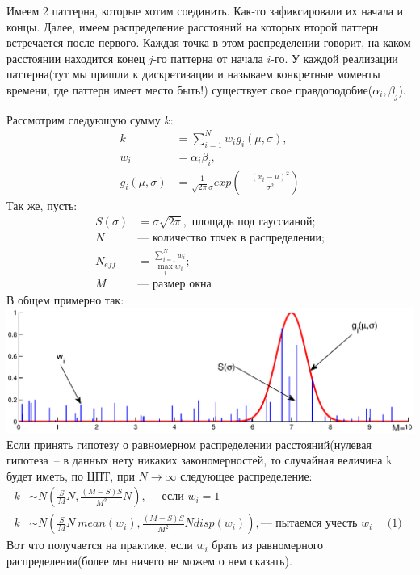 \documentclass[12pt]{letter}
\author{Вишневский~Валерий~Викторович}
\begin{document}
Имеем 2 паттерна, которые хотим соединить. Как-то зафиксировали их начала и концы.
Далее, имеем распределение расстояний на которых второй паттерн встречается после первого.
Каждая точка в этом распределении говорит, на каком расстоянии находится конец $j$-го паттерна
от начала $i$-го. У каждой реализации паттерна(тут мы пришли к дискретизации и называем конкретные
моменты времени, где паттерн имеет место быть!) существует свое правдоподобие($\alpha_i, \beta_j $).

Рассмотрим следующую сумму $k$:
\[
\begin{aligned}
k&=\sum_{i=1}^N w_ig_i(\mu,\sigma),   \\
w_i&=\alpha_i\beta_i, \\
g_i(\mu,\sigma)&=\frac{1}{\sqrt{2\pi}\sigma}exp\left(- \frac{(x_i-\mu)^2}{\sigma^2} \right) 
\end{aligned}
\]
Так же, пусть:
$$
\begin{aligned}
S(\sigma) &= \sigma\sqrt{2\pi}, \text{ площадь под гауссианой};\\
N &\text{--- количество точек в распределении};\\
N_{eff} &= \frac{\sum_{i=1}^N w_i}{\max_i{w_i}};\\
M &\text{--- размер окна}
\end{aligned}
$$
В общем примерно так:\\
\includegraphics[width=200mm]{example.eps}
Если принять гипотезу о равномерном распределении расстояний(нулевая гипотеза~-- в данных нету никаких
закономерностей, то случайная величина k будет иметь, по ЦПТ, при $N\to\infty$ следующее распределение:
$$
\begin{aligned}\label{Norm}
k &\sim N \left( \frac SM N, \frac{(M-S)S}{M^2}N \right), \text{--- если $w_i=1$} \\
k &\sim N \left( \frac SM N~ mean({w_i}), \frac{(M-S)S}{M^2}N disp(w_i)  \right), \text{--- пытаемся учесть $w_i$~~~~(1) } 
\end{aligned}
$$
Вот что получается на практике, если $w_i$ брать из равномерного распределения(более мы ничего не можем о нем сказать). 
\end{document}
